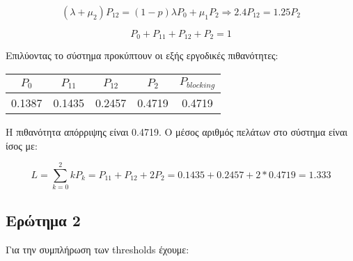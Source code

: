 \documentclass[12pt]{article}
\begin{document}
\begin{equation}
    (\lambda + \mu_2) P_{12} = (1-p) \lambda P_0 + \mu_1 P_2 \Rightarrow 2.4 P_{12} = 1.25P_2
\end{equation}

\begin{equation}
    P_0 + P_{11} + P_{12} + P_2 = 1
\end{equation}

Επιλύοντας το σύστημα προκύπτουν οι εξής εργοδικές πιθανότητες: 

\begin{center}
    \begin{tabular}{|c|c|c|c|c|}
        \hline
        $P_0$ & $P_{11}$ & $P_{12}$ & $P_2$ & $P_{blocking}$ \\
        \hline
        0.1387 & 0.1435 & 0.2457 & 0.4719 & 0.4719 \\
        \hline
    \end{tabular}
\end{center}

Η πιθανότητα απόρριψης είναι 0.4719. Ο μέσος αριθμός πελάτων στο σύστημα είναι ίσος με:

\begin{equation}
    L = \sum_{k = 0}^{2} kP_k = P_{11} + P_{12} + 2P_2 = 0.1435 + 0.2457 + 2*0.4719 = 1.333
\end{equation}






\subsection{Ερώτημα 2}

Για την συμπλήρωση των thresholds έχουμε:
\end{document}
